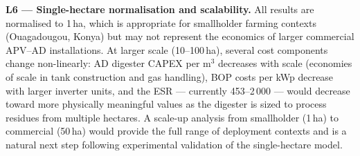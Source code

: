 \textbf{L6 --- Single-hectare normalisation and scalability.}
All results are normalised to 1\,ha, which is appropriate for
smallholder farming contexts (Ouagadougou, Konya) but may not
represent the economics of larger commercial APV--AD installations.
At larger scale (10--100\,ha), several cost components change
non-linearly: AD digester CAPEX per m$^3$ decreases with scale
(economies of scale in tank construction and gas handling),
BOP costs per kWp decrease with larger inverter units, and the
ESR --- currently 453--2\,000 --- would decrease toward more
physically meaningful values as the digester is sized to process
residues from multiple hectares. A scale-up analysis from
smallholder (1\,ha) to commercial (50\,ha) would provide the
full range of deployment contexts and is a natural next step
following experimental validation of the single-hectare model.